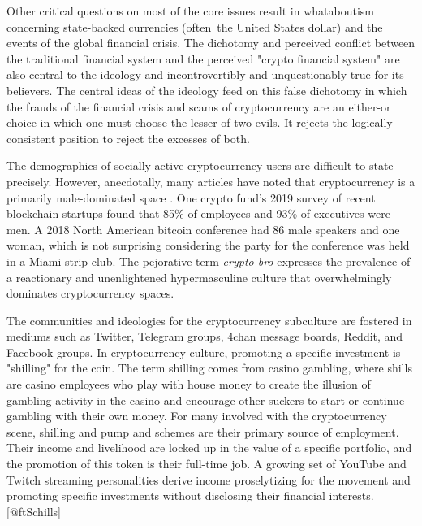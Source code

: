 
Other critical questions on most of the core issues result in whataboutism
concerning state-backed currencies (often the United States dollar) and the
events of the global financial crisis. The dichotomy and perceived conflict
between the traditional financial system and the perceived "crypto financial
system" are also central to the ideology and incontrovertibly and unquestionably
true for its believers. The central ideas of the ideology feed on this false
dichotomy in which the frauds of the financial crisis and scams of
cryptocurrency are an either-or choice in which one must choose the lesser of
two evils. It rejects the logically consistent position to reject the excesses
of both. \cite{golumbia_zealots_2018, wolf_libertarian_2019, golumbia_cyberlibertarians_2013}


The demographics of socially active cryptocurrency users are difficult to state
precisely. However, anecdotally, many articles have noted that cryptocurrency is
a primarily male-dominated space \cite{penny_four_2018}. One crypto fund's 2019 survey
of recent blockchain startups found that 85\% of employees and 93\% of
executives were men. A 2018 North American bitcoin conference had 86 male
speakers and one woman, which is not surprising considering the party for the
conference was held in a Miami strip club. The pejorative term \textit{crypto
bro} expresses the prevalence of a reactionary and unenlightened hypermasculine
culture that overwhelmingly dominates cryptocurrency spaces.


The communities and ideologies for the cryptocurrency subculture are fostered in
mediums such as Twitter, Telegram groups, 4chan message boards, Reddit, and
Facebook groups. In cryptocurrency culture, promoting a specific investment is
"shilling" for the coin. The term shilling comes from casino gambling, where
shills are casino employees who play with house money to create the illusion of
gambling activity in the casino and encourage other suckers to start or continue
gambling with their own money. For many involved with the cryptocurrency scene,
shilling and pump and schemes are their primary source of employment. Their
income and livelihood are locked up in the value of a specific portfolio, and
the promotion of this token is their full-time job. A growing set of YouTube and
Twitch streaming personalities derive income proselytizing for the movement and
promoting specific investments without disclosing their financial interests.
[@ftSchills]

